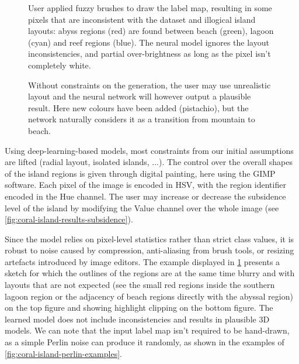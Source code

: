 \begin{figure}
\caption{User applied fuzzy brushes to draw the label map, resulting in some pixels that are inconsistent with the dataset and illogical island layouts: abyss regions (red) are found between beach (green), lagoon (cyan) and reef regions (blue). The neural model ignores the layout inconsistencies, and partial over-brightness as long as the pixel isn't completely white.}
\label{fig:coral-island-results-fuzzy}
\end{figure}
\begin{figure}
\caption{Without constraints on the generation, the user may use unrealistic layout and the neural network will however output a plausible result. Here new colours have been added (pistachio), but the network naturally considers it as a transition from mountain to beach.}
\label{fig:coral-island-results_dino}
\end{figure}

Using deep-learning-based models, most constraints from our initial assumptions are lifted (radial layout, isolated islands, ...). The control over the overall shapes of the island regions is given through digital painting, here using the GIMP software. Each pixel of the image is encoded in HSV, with the region identifier encoded in the Hue channel. The user may increase or decrease the subsidence level of the island by modifying the Value channel over the whole image (see \cref{fig:coral-island-results-subsidence}).

Since the model relies on pixel-level statistics rather than strict class values, it is robust to noise caused by compression, anti-aliasing from brush tools, or resizing artefacts introduced by image editors. The example displayed in \cref{fig:coral-island-results-fuzzy} presents a sketch for which the outlines of the regions are at the same time blurry and with layouts that are not expected (see the small red regions inside the southern lagoon region or the adjacency of beach regions directly with the abyssal region) on the top figure and showing highlight clipping on the bottom figure. The learned model does not include inconsistencies and results in plausible 3D models. We can note that the input label map isn't required to be hand-drawn, as a simple Perlin noise can produce it randomly, as shown in the examples of \cref{fig:coral-island-perlin-examples}.

